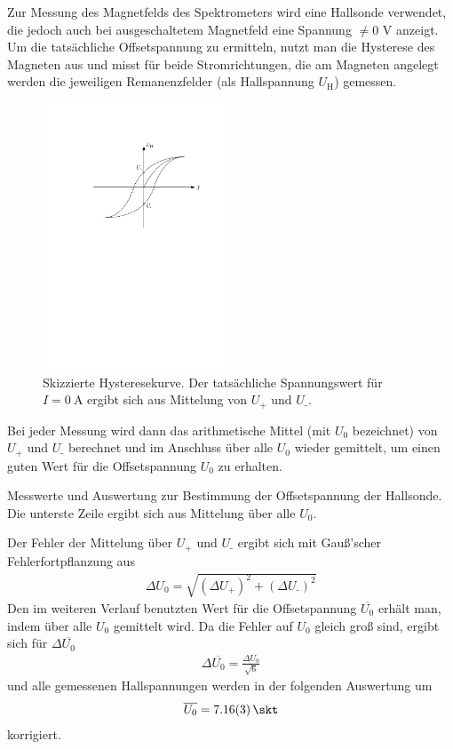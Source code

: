 \documentclass[11pt, a4paper]{article}
\numberwithin{equation}{section}
\begin{document}
Zur Messung des Magnetfelds des Spektrometers wird eine Hallsonde verwendet, die jedoch auch bei ausgeschaltetem Magnetfeld eine Spannung $\neq 0$ \si{\volt} anzeigt.
Um die tatsächliche Offsetspannung zu ermitteln, nutzt man die Hysterese des Magneten aus und misst für beide Stromrichtungen, die am Magneten angelegt werden die jeweiligen Remanenzfelder (als Hallspannung $U_\text{H}$) gemessen.
\begin{figure}[h]
	\centering
	\includegraphics[width=0.5\textwidth]{./figures/hysterese.pdf}
	\caption{Skizzierte Hysteresekurve. Der tatsächliche Spannungswert für $I=\SI{0}{\ampere}$ ergibt sich aus Mittelung von $U_\text{+}$ und $U_\text{-}$.}
	\label{fig:hysterese}
\end{figure}
Bei jeder Messung wird dann das arithmetische Mittel (mit $U_0$ bezeichnet) von $U_\text{+}$ und $U_\text{-}$ berechnet und im Anschluss über alle $U_0$ wieder gemittelt, um einen guten Wert für die Offsetspannung $U_0$ zu erhalten.
\begin{table}[h]
	\centering
	
	\caption{Messwerte und Auswertung zur Bestimmung der Offsetspannung der Hallsonde. Die unterste Zeile ergibt sich aus Mittelung über alle $U_0$.}
	\label{tab:offset}
\end{table}
Der Fehler der Mittelung über $U_\text{+}$ und $U_\text{-}$ ergibt sich mit Gauß'scher Fehlerfortpflanzung aus
\begin{align}
	\Delta U_0 = \sqrt{(\Delta U_\text{+})^2 + (\Delta U_\text{-})^2}
\end{align}
Den im weiteren Verlauf benutzten Wert für die Offsetspannung $\overline{U_0}$ erhält man, indem über alle $U_0$ gemittelt wird. Da die Fehler auf $U_0$ gleich groß sind, ergibt sich für $\Delta\overline{U_0}$
\begin{align}
	\Delta\overline{U_0} = \frac{\Delta U_0}{\sqrt{6}}
\end{align}
und alle gemessenen Hallspannungen werden in der folgenden Auswertung um
\begin{align}
	\overline{U_0} = \SI{7.16 +- 0.03}{\skt}
\end{align}
korrigiert.
\end{document}
